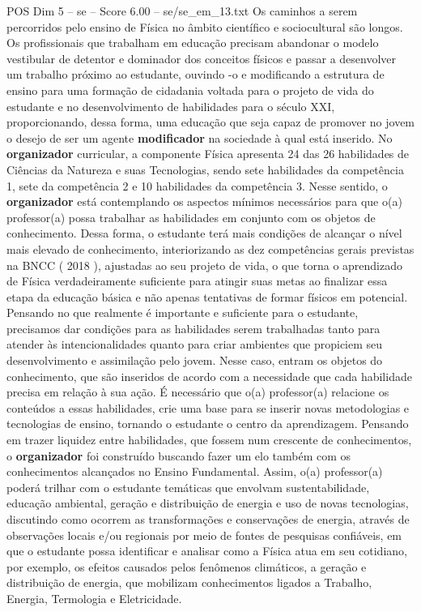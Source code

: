 \begin{textsample}{POS Dim 5 – se – Score 6.00 – se/se\_em\_13.txt}
Os caminhos a serem percorridos pelo ensino de Física no âmbito científico e sociocultural são longos.
Os profissionais que trabalham em educação precisam abandonar o modelo vestibular de detentor e dominador dos conceitos físicos e passar a desenvolver um trabalho próximo ao estudante, ouvindo -o e modificando a estrutura de ensino para uma formação de cidadania voltada para o projeto de vida do estudante e no desenvolvimento de habilidades para o século XXI, proporcionando, dessa forma, uma educação que seja capaz de promover no jovem o desejo de ser um agente \textbf{modificador} na sociedade à qual está inserido.
No \textbf{organizador} curricular, a componente Física apresenta 24 das 26 habilidades de Ciências da Natureza e suas Tecnologias, sendo sete habilidades da competência 1, sete da competência 2 e 10 habilidades da competência 3.
Nesse sentido, o \textbf{organizador} está contemplando os aspectos mínimos necessários para que o(a) professor(a) possa trabalhar as habilidades em conjunto com os objetos de conhecimento.
Dessa forma, o estudante terá mais condições de alcançar o nível mais elevado de conhecimento, interiorizando as dez competências gerais previstas na BNCC ( 2018 ), ajustadas ao seu projeto de vida, o que torna o aprendizado de Física verdadeiramente suficiente para atingir suas metas ao finalizar essa etapa da educação básica e não apenas tentativas de formar físicos em potencial.
Pensando no que realmente é importante e suficiente para o estudante, precisamos dar condições para as habilidades serem trabalhadas tanto para atender às intencionalidades quanto para criar ambientes que propiciem seu desenvolvimento e assimilação pelo jovem.
Nesse caso, entram os objetos do conhecimento, que são inseridos de acordo com a necessidade que cada habilidade precisa em relação à sua ação.
É necessário que o(a) professor(a) relacione os conteúdos a essas habilidades, crie uma base para se inserir novas metodologias e tecnologias de ensino, tornando o estudante o centro da aprendizagem.
Pensando em trazer liquidez entre habilidades, que fossem num crescente de conhecimentos, o \textbf{organizador} foi construído buscando fazer um elo também com os conhecimentos alcançados no Ensino Fundamental.
Assim, o(a) professor(a) poderá trilhar com o estudante temáticas que envolvam sustentabilidade, educação ambiental, geração e distribuição de energia e uso de novas tecnologias, discutindo como ocorrem as transformações e conservações de energia, através de observações locais e/ou regionais por meio de fontes de pesquisas confiáveis, em que o estudante possa identificar e analisar como a Física atua em seu cotidiano, por exemplo, os efeitos causados pelos fenômenos climáticos, a geração e distribuição de energia, que mobilizam conhecimentos ligados a Trabalho, Energia, Termologia e Eletricidade.

\end{textsample}
